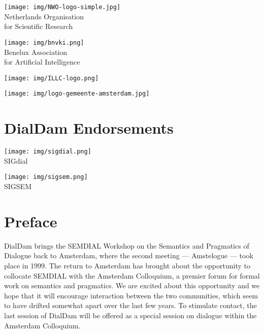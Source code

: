 \documentclass[a4paper,12pt,oneside]{book}
\begin{document}
\begin{center}
\begin{minipage}{6cm}\centering \small
\texttt{[image: img/NWO-logo-simple.jpg]}\\
Netherlands Organisation\\
 for Scientific Research 
\end{minipage}\hspace{2.5cm}
\begin{minipage}{6cm}\centering \small
\texttt{[image: img/bnvki.png]}\\
Benelux Association\\
for Artificial Intelligence
\end{minipage}

\vspace{2cm}
\begin{minipage}{6cm}\centering
\texttt{[image: img/ILLC-logo.png]}
\end{minipage}
\hspace{2.5cm}
\begin{minipage}{6cm}\centering
\texttt{[image: img/logo-gemeente-amsterdam.jpg]}
\end{minipage}
\end{center}

\vfill
\section*{DialDam Endorsements}

\begin{center}
\begin{minipage}{6cm}\centering \small
\texttt{[image: img/sigdial.png]}\\
SIGdial
\end{minipage}
\begin{minipage}{6cm}\centering \small
\texttt{[image: img/sigsem.png]}\\
SIGSEM
\end{minipage}
\end{center}

\clearpage

\section*{Preface}

DialDam brings the SEMDIAL Workshop on the Semantics and Pragmatics of
Dialogue back to Amsterdam, where the second meeting ---
  Amstelogue --- took place in 1999. The return to Amsterdam has brought about the
opportunity to collocate SEMDIAL with the Amsterdam Colloquium, a
premier forum for formal work on semantics and pragmatics. 
We are excited about this opportunity and we hope that it will
encourage interaction between the two communities, which seem to have
drifted somewhat apart over the last few years. To stimulate contact, the last session
of DialDam will be offered as a special session on dialogue within the Amsterdam
Colloquium.
\end{document}
